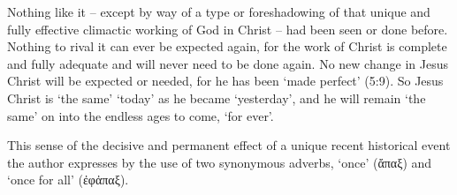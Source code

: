 Nothing like it -- except by way of a type or foreshadowing of that unique and
fully effective climactic working of God in Christ -- had been seen or done
before.
Nothing to rival it can ever be expected again, for the work of Christ is
complete and fully adequate and will never need to be done again.
No new change in Jesus Christ will be expected or needed, for he has been `made
perfect' (5:9).
So Jesus Christ is `the same' `today' as he became `yesterday', and he will
remain `the same' on into the endless ages to come, `for ever'.
\newline

This sense of the decisive and permanent effect of a unique recent historical
event the author expresses by the use of two synonymous adverbs, `once'
(ἄπαξ) and `once for all' (ἐφἀπαξ).
